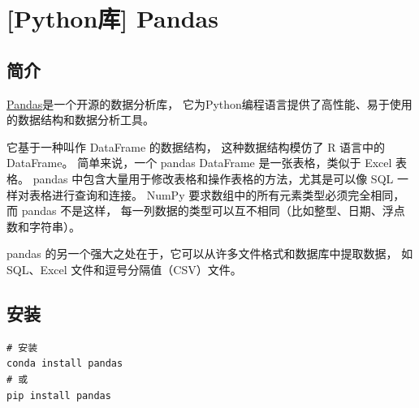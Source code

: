 \chapter{[Python库] Pandas}
\label{cha:pandas_intro}
\section{简介}
\label{sec:pandas_intro}
\href{https://pandas.pydata.org/}{Pandas}是一个开源的数据分析库，
它为Python编程语言提供了高性能、易于使用的数据结构和数据分析工具。

它基于一种叫作 DataFrame 的数据结构，
这种数据结构模仿了 R 语言中的 DataFrame。
简单来说，一个 pandas DataFrame 是一张表格，类似于 Excel 表格。
pandas 中包含大量用于修改表格和操作表格的方法，尤其是可以像 SQL 一样对表格进行查询和连接。
NumPy 要求数组中的所有元素类型必须完全相同，而 pandas 不是这样，
每一列数据的类型可以互不相同（比如整型、日期、浮点数和字符串）。

pandas 的另一个强大之处在于，它可以从许多文件格式和数据库中提取数据，
如SQL、Excel 文件和逗号分隔值（CSV）文件。

\section{安装}
\label{sec:install_pandas}
\begin{lstlisting}[style=demostyle,numbers=none]
# 安装
conda install pandas
# 或
pip install pandas
\end{lstlisting}



